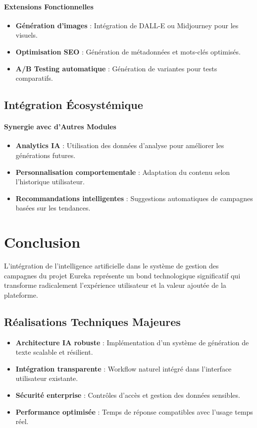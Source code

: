 \paragraph{Extensions Fonctionnelles}
\begin{itemize}[label=\textbullet]
    \item \textbf{Génération d'images} : Intégration de DALL-E ou Midjourney pour les visuels.
    \item \textbf{Optimisation SEO} : Génération de métadonnées et mots-clés optimisés.
    \item \textbf{A/B Testing automatique} : Génération de variantes pour tests comparatifs.
\end{itemize}

\subsection{Intégration Écosystémique}

\paragraph{Synergie avec d'Autres Modules}
\begin{itemize}[label=\textbullet]
    \item \textbf{Analytics IA} : Utilisation des données d'analyse pour améliorer les générations futures.
    \item \textbf{Personnalisation comportementale} : Adaptation du contenu selon l'historique utilisateur.
    \item \textbf{Recommandations intelligentes} : Suggestions automatiques de campagnes basées sur les tendances.
\end{itemize}

\section{Conclusion}

L'intégration de l'intelligence artificielle dans le système de gestion des campagnes du projet Eureka représente un bond technologique significatif qui transforme radicalement l'expérience utilisateur et la valeur ajoutée de la plateforme.

\subsection{Réalisations Techniques Majeures}

\begin{itemize}[label=\textbullet]
    \item \textbf{Architecture IA robuste} : Implémentation d'un système de génération de texte scalable et résilient.
    \item \textbf{Intégration transparente} : Workflow naturel intégré dans l'interface utilisateur existante.
    \item \textbf{Sécurité enterprise} : Contrôles d'accès et gestion des données sensibles.
    \item \textbf{Performance optimisée} : Temps de réponse compatibles avec l'usage temps réel.
\end{itemize}

